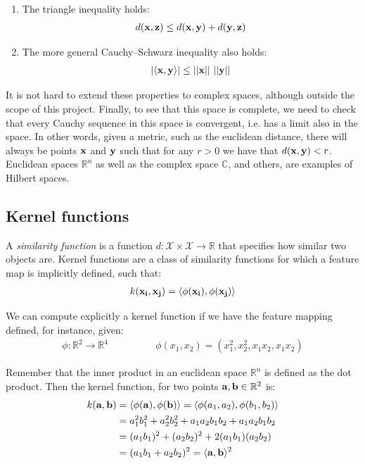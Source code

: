 \begin{enumerate}
    \item The triangle inequality holds:
    \begin{align*}
        d(\mathbf{x}, \mathbf{z}) \le d(\mathbf{x}, \mathbf{y}) + d(\mathbf{y}, \mathbf{z}) 
    \end{align*}
    \item The more general Cauchy–Schwarz inequality also holds:
    \begin{align*}
        |\langle\mathbf{x}, \mathbf{y}\rangle| \le ||\mathbf{x}||\ ||\mathbf{y}|| 
    \end{align*}
\end{enumerate}

It is not hard to extend these properties to complex spaces, although outside the scope of this project. Finally, to see that this space is complete, we need to check that every Cauchy sequence in this space is convergent, i.e. has a limit also in the space. In other words, given a metric, such as the euclidean distance, there will always be points $\mathbf{x}$ and $\mathbf{y}$ such that for any $r > 0$ we have that $d(\mathbf{x}, \mathbf{y}) < r$. Euclidean spaces $\mathbb{R}^n$ as well as the complex space $\mathbb{C}$, and others, are examples of Hilbert spaces.

\subsection{Kernel functions}

A \emph{similarity function} is a function $d : \mathcal{X \times X} \rightarrow \mathbb{R}$ that specifies how similar two objects are. Kernel functions are a class of similarity functions for which a feature map is implicitly defined, such that:
\begin{align}
    k(\mathbf{x_i}, \mathbf{x_j}) = \langle\phi(\mathbf{x_i}), \phi(\mathbf{x_j})\rangle
\end{align}

We can compute explicitly a kernel function if we have the feature mapping defined, for instance, given:
\begin{align*}
    \phi : \mathbb{R}^2 \rightarrow \mathbb{R}^4 &
    \qquad\qquad
    \phi(x_1, x_2) = (x_1^2, x_2^2, x_1x_2, x_1x_2)
\end{align*}

Remember that the inner product in an euclidean space $\mathbb{R}^n$ is defined as the dot product. Then the kernel function, for two points $\mathbf{a}, \mathbf{b} \in \mathbb{R}^2$ is:
\begin{align*}
    k(\mathbf{a}, \mathbf{b}) &= \langle\phi(\mathbf{a}), \phi(\mathbf{b})\rangle = \langle\phi(a_1, a_2), \phi(b_1, b_2)\rangle \\
    &= a_1^2b_1^2 + a_2^2b_2^2 + a_1a_2b_1b_2 + a_1a_2b_1b_2 \\
    &= (a_1b_1)^2 + (a_2b_2)^2 + 2(a_1b_1)(a_2b_2) \\
    &= (a_1b_1 + a_2b_2)^2 = \langle\mathbf{a}, \mathbf{b}\rangle^2
\end{align*}


